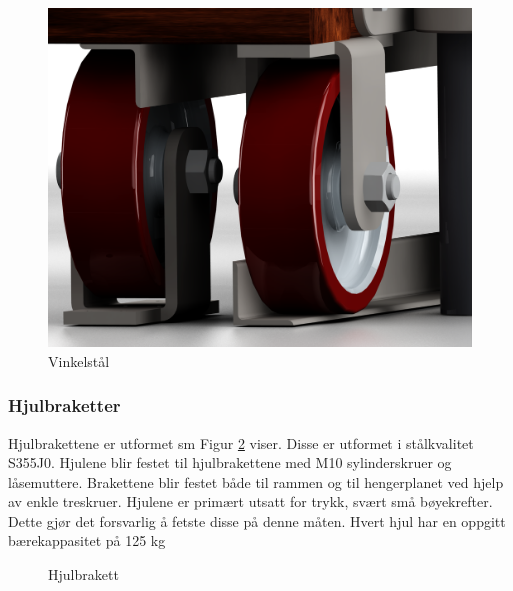 \begin{figure}[H]
\centerline{\includegraphics [width=15cm]{images/9.png}}
\caption{Vinkelstål}
\label{F2}
\end{figure}

\subsubsection{Hjulbraketter}

Hjulbrakettene er utformet sm Figur \ref{F3} viser. Disse er utformet i stålkvalitet S355J0. 
Hjulene blir festet til hjulbrakettene med M10 sylinderskruer og låsemuttere. Brakettene blir festet både til rammen og til hengerplanet ved hjelp av enkle treskruer. Hjulene er primært utsatt for trykk, svært små bøyekrefter. Dette gjør det forsvarlig å fetste disse på denne måten. Hvert hjul har en oppgitt bærekappasitet på 125 kg 

\begin{figure}[H]
\centering   
{}
\caption{Hjulbrakett}
\label{F3}
\end{figure}

